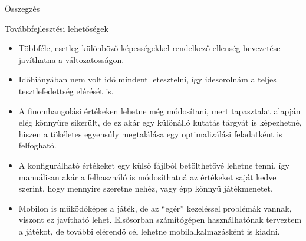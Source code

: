 \begin{MyChapter}{Összegzés}
\begin{MySection}{Továbbfejlesztési lehetőségek}
\begin{itemize}
			\item Többféle, esetleg különböző képességekkel rendelkező ellenség bevezetése javíthatna a változatosságon.
			
			\item Időhiányában nem volt idő mindent letesztelni, így idesorolnám a teljes tesztlefedettség elérését is.
			
			\item A finomhangolási értékeken lehetne még módosítani, mert tapasztalat alapján elég könnyűre sikerült, de ez akár egy különálló kutatás tárgyát is képezhetné, hiszen a tökéletes egyensúly megtalálása egy optimalizálási feladatként is felfogható.
			
			\item A konfigurálható értékeket egy külső fájlból betölthetővé lehetne tenni, így manuálisan akár a felhasználó is módosíthatná az értékeket saját kedve szerint, hogy mennyire szeretne nehéz, vagy épp könnyű játékmenetet.
			
			\item Mobilon is működőképes a játék, de az ``egér'' kezeléssel problémák vannak, viszont ez javítható lehet. Elsősorban számítógépen használhatónak terveztem a játékot, de további elérendő cél lehetne mobilalkalmazásként is kiadni.
		\end{itemize}
		
	\end{MySection}

\end{MyChapter}